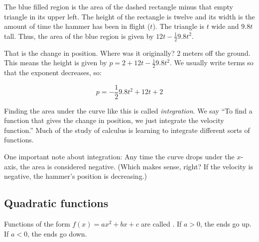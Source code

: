 The blue filled region is the area of the dashed rectangle minus that
empty triangle in its upper left.  The height of the rectangle is
twelve and its width is the amount of time the hammer has been in
flight ($t$). The triangle is $t$ wide and $9.8t$ tall. Thus, the
area of the blue region is given by $12t - \frac{1}{2}9.8 t^2$.

That is the change in position. Where was it originally? 2 meters off
the ground. This means the height is given by $p = 2 + 12t - \frac{1}{2}9.8t^2$.
We usually write terms so that the exponent decreases, so:

$$p = - \frac{1}{2}9.8t^2 + 12t + 2$$

Finding the area under the curve like this is called
\textit{integration}. We say ``To find a function that gives the
change in position, we just integrate the velocity function.''  Much
of the study of calculus is learning to integrate different sorts of
functions.

One important note about integration: Any time the curve drops under
the $x$-axis, the area is considered negative. (Which makes sense,
right? If the velocity is negative, the hammer's position is
decreasing.)




\subsection{Quadratic functions}

Functions of the form $f(x) = a x^2 + b x + c$ are called 
. 
If $a > 0$, the ends go up.
If $a < 0$, the ends go down.


